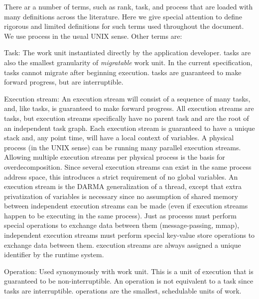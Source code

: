 There ar a number of terms, such as \gls{rank}, \gls{task}, and \gls{process}
that are loaded with many definitions across the literature. 
Here we give special attention to define rigorous and limited definitions for
such terms used throughout the document.
We use \gls{process} in the usual UNIX sense. Other terms are:
\begin{compactdesc}
\item [Task:] The work unit instantiated directly by the application developer. 
  \Glspl{task} are also the smallest granularity of \emph{migratable} work unit. 
  In the current specification, \glspl{task} cannot migrate after beginning execution.
  \Glspl{task} are guaranteed to make forward progress, but are interruptible.
\item [Execution stream:] An \gls{execution stream} will consist of a sequence
  of many \glspl{task}, and, like \glspl{task}, is guaranteed to make forward progress.
  All \glspl{execution stream} are \glspl{task}, but \glspl{execution stream} specifically 
  have no parent \gls{task} and are the root of an independent task graph.
  Each \gls{execution stream} is guaranteed to 
  have a unique stack and, any point time, will have a local context of variables.
  A physical \gls{process} (in the UNIX sense) can be running many parallel
  \glspl{execution stream}.  Allowing multiple \glspl{execution stream} per
  physical \gls{process} is the basis for \gls{overdecomposition}.  Since
  several \glspl{execution stream} can exist in the same \gls{process} address space, 
  this introduces a strict requirement of no global variables.
  An \gls{execution stream} is the \gls{DARMA} generalization of a thread, 
  except that extra privatization of variables is necessary since no assumption 
  of shared memory between independent \glspl{execution stream} can be made
  (even if \glspl{execution stream} happen to be executing in the same
  \gls{process}).  Just as \glspl{process} must perform special operations 
  to exchange data between them (message-passing, mmap), independent 
  \glspl{execution stream} must perform special \gls{key-value store} operations 
  to exchange data between them.  \Glspl{execution stream} are always assigned 
  a unique identifier by the \gls{runtime system}.
\item [Operation:]Used synonymously with work unit. This is a unit of execution that is guaranteed to be non-interruptible. 
  An \gls{operation} is not equivalent to a \gls{task} since \glspl{task} are interruptible.  
  \Glspl{operation} are the smallest, schedulable units of work.  

\end{compactdesc}
